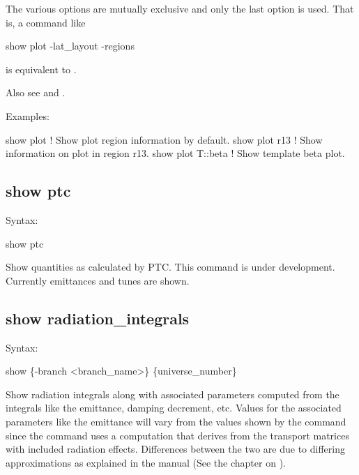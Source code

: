 {{{{{{{{{The various  options are mutually exclusive and only the last option is used. That is,
a command like
\begin{example}
  show plot -lat_layout -regions
\end{example}
is equivalent to .

Also see  and .

Examples:
\begin{example}
  show plot         ! Show plot region information by default.
  show plot r13     ! Show information on plot in region r13.
  show plot T::beta ! Show template beta plot.
\end{example}


\subsection{show ptc}
\label{s:show.ptc}

Syntax:
\begin{example}
  show ptc 
\end{example}

Show quantities as calculated by PTC. This command is under development. Currently emittances and
tunes are shown.


\subsection{show radiation_integrals}
\label{s:show.rad.int}

Syntax:
\begin{example}
  show  \{-branch <branch_name>\} \{universe_number\}
\end{example}

Show radiation integrals along with associated parameters computed from the integrals like the
emittance, damping decrement, etc. Values for the associated parameters like the emittance will vary
from the values shown by the  command since the  command uses a
computation that derives from the transport matrices with included radiation effects. Differences
between the two are due to differing approximations as explained in the \bmad manual (See the
chapter on ).

}}}}}}}}}
